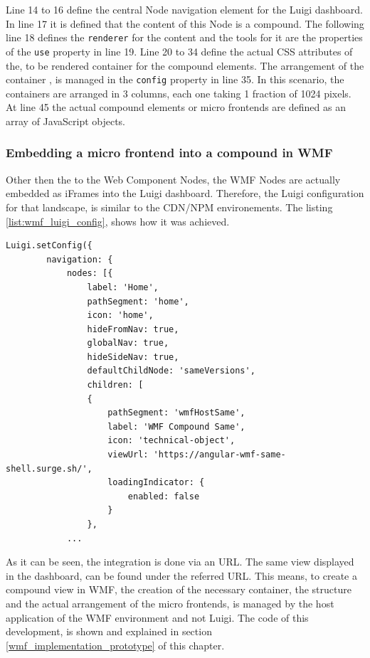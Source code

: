 Line 14 to 16 define the central Node navigation element for the Luigi dashboard. In line 17 it is defined that the content of this Node is a compound. The following line 18 defines the \texttt{renderer} for the content and the tools for it are the properties of the \texttt{use} property in line 19. Line 20 to 34 define the actual CSS attributes of the, to be rendered container for the compound elements. The arrangement of the container , is managed in the \texttt{config} property in line 35. In this scenario, the containers are arranged in 3 columns, each one taking 1 fraction of 1024 pixels.
At line 45 the actual compound elements or micro frontends are defined as an array of JavaScript objects.

\subsubsection{Embedding a micro frontend into a compound in WMF}
\label{embedd_mfe_in_wmf}

Other then the to the Web Component Nodes, the WMF Nodes are actually embedded as iFrames into the Luigi dashboard. Therefore, the Luigi configuration for that landscape, is similar to the CDN/NPM environements. The listing \ref{list:wmf_luigi_config}, shows how it was achieved.

\begin{lstlisting}[caption=Example configuration to embed a WMF micro frontend compound as a Node in Luigi, label=list:wmf_luigi_config,  xleftmargin=.0\textwidth, xrightmargin=.0\textwidth]
	Luigi.setConfig({
		navigation: {
			nodes: [{
				label: 'Home',
				pathSegment: 'home',
				icon: 'home',
				hideFromNav: true,
				globalNav: true,
				hideSideNav: true,
				defaultChildNode: 'sameVersions',
				children: [
                {
					pathSegment: 'wmfHostSame',
					label: 'WMF Compound Same',
					icon: 'technical-object',
					viewUrl: 'https://angular-wmf-same-shell.surge.sh/',
					loadingIndicator: {
						enabled: false
					}
				},
			...
\end{lstlisting}

As it can be seen, the integration is done via an URL. The same view displayed in the dashboard, can be found under the referred URL. This means, to create a compound view in WMF, the creation of the necessary container, the structure and the actual arrangement of the micro frontends, is managed by the host application of the WMF environment and not Luigi.
The code of this development, is shown and explained in section \ref{wmf_implementation_prototype} of this chapter.

